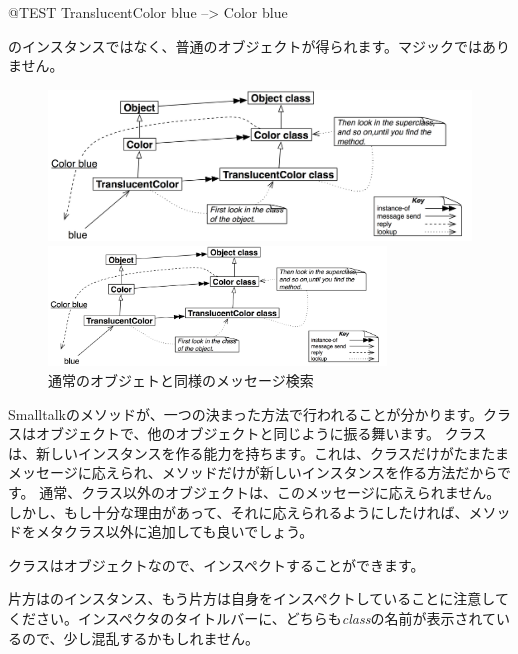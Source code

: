 \documentclass[a4paper,10pt,twoside]{book}
\begin{document}
\begin{code}{@TEST}
TranslucentColor blue --> Color blue
\end{code}
\noindent
{}のインスタンスではなく、普通のオブジェクトが得られます。マジックではありません。

\begin{center}
\begin{figure}[!ht]
\ifluluelse
	{\centerline {\includegraphics[width=\textwidth]{TranslucentColorBlue}}}
	{\centerline {\includegraphics[width=0.8\textwidth]{TranslucentColorBlue}}}
\caption{通常のオブジェトと同様のメッセージ検索}
\end{figure}
\end{center}

Smalltalkのメソッドが、一つの決まった方法で行われることが分かります。クラスはオブジェクトで、他のオブジェクトと同じように振る舞います。
クラスは、新しいインスタンスを作る能力を持ちます。これは、クラスだけがたまたまメッセージに応えられ、メソッドだけが新しいインスタンスを作る方法だからです。
通常、クラス以外のオブジェクトは、このメッセージに応えられません。しかし、もし十分な理由があって、それに応えられるようにしたければ、メソッドをメタクラス以外に追加しても良いでしょう。

クラスはオブジェクトなので、インスペクトすることができます。


\noindent
片方はのインスタンス、もう片方は自身をインスペクトしていることに注意してください。インスペクタのタイトルバーに、どちらも\emph{class}の名前が表示されているので、少し混乱するかもしれません。
\end{document}
